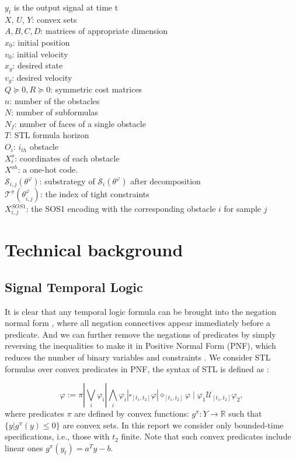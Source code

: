 \documentclass[a4paper]{report}
\begin{document}
$y_t$ is the output signal at time t\\
$X$, $U$, $Y$: convex sets\\
$A, B, C, D$: matrices of appropriate dimension\\
$x_0$: initial position\\
$v_0$: initial velocity\\
$x_g$: desired state\\
$v_g$: desired velocity\\
$Q\succeq 0,R\succeq 0 $: symmetric cost matrices\\
$n$: number of the obstacles\\
$N$: number of subformulas\\
$N_f$: number of faces of a single obstacle\\
$T$: STL formula horizon\\
$O_i$: $i_{th}$ obstacle\\
$X_i^o$: coordinates of each obstacle \\
$X^{oh}$: a one-hot code. \\
$\mathcal{S}_{i,j}(\theta^{\varphi})$: substrategy of $\mathcal{S}_{i}(\theta^{\varphi})$ after decomposition\\
$\mathcal{T}^{\pi}(\theta_{i,j}^{\varphi})$: the index of tight constraints\\
$X_{i,j}^{SOS1}$: the SOS1 encoding with the corresponding obstacle $i$ for sample $j$\\

\section{Technical background}


\subsection{Signal Temporal Logic}

It is clear that any temporal logic formula can be brought into the negation normal form \cite[]{baier2008principles}, where
all negation connectives appear immediately before a predicate. And we can further remove the negations of predicates by simply reversing the inequalities to make it in Positive Normal Form (PNF), which reduces the number of binary variables and constraints \cite{2019Formal}.
We consider STL formulas over convex predicates in PNF, the syntax of STL is defined as : 

\begin{equation}
\varphi:=\pi|\bigvee_{i} \varphi_{i}| \bigwedge_{i} \varphi_{i}|\square_{\left[t_{1}, t_{2}\right]} \varphi| \diamond_{\left[t_{1}, t_{2}\right]} \varphi \mid \varphi_{1} \mathcal{U}_{\left[t_{1}, t_{2}\right]} \varphi_{2},
\end{equation}
where predicates $\pi$ are defined by convex functions: $ g^\pi: Y \rightarrow \mathbb{R}$ such that $\{y|g^\pi(y)\leq 0\} $ are convex sets. In this report we consider only bounded-time specifications, i.e., those with $t_2$ finite. Note that such convex predicates include linear ones $g^\pi (y_t) = a^Ty-b$.
\end{document}
